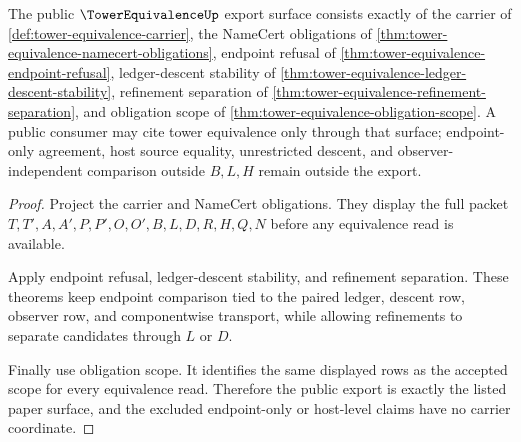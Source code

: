 \begin{theorem}
\label{thm:tower-equivalence-public-export-surface}
The public $\TowerEquivalenceUp$ export surface consists exactly of the carrier of \autoref{def:tower-equivalence-carrier}, the NameCert obligations of \autoref{thm:tower-equivalence-namecert-obligations}, endpoint refusal of \autoref{thm:tower-equivalence-endpoint-refusal}, ledger-descent stability of \autoref{thm:tower-equivalence-ledger-descent-stability}, refinement separation of \autoref{thm:tower-equivalence-refinement-separation}, and obligation scope of \autoref{thm:tower-equivalence-obligation-scope}. A public consumer may cite tower equivalence only through that surface; endpoint-only agreement, host source equality, unrestricted descent, and observer-independent comparison outside $B,L,H$ remain outside the export.
\end{theorem}
\begin{proof}
Project the carrier and NameCert obligations. They display the full packet $T,T',A,A',P,P',O,O',B,L,D,R,H,Q,N$ before any equivalence read is available.

Apply endpoint refusal, ledger-descent stability, and refinement separation. These theorems keep endpoint comparison tied to the paired ledger, descent row, observer row, and componentwise transport, while allowing refinements to separate candidates through $L$ or $D$.

Finally use obligation scope. It identifies the same displayed rows as the accepted scope for every equivalence read. Therefore the public export is exactly the listed paper surface, and the excluded endpoint-only or host-level claims have no carrier coordinate.
\end{proof}

